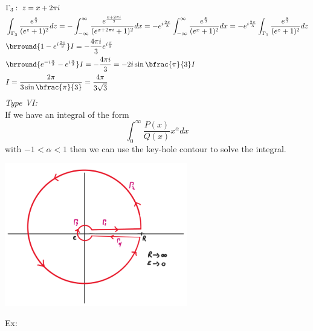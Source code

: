 \begin{align*}
    &\Gamma_3:\ z=x+2\pi i\\
    &\int_{\Gamma_3}\frac{e^{\frac{z}{3}}}{(e^z+1)^2}dz=-\int_{-\infty}^\infty \frac{e^{\frac{x+2\pi i}{3}}}{(e^{x+2\pi i}+1)^2}dx=-e^{i\frac{2\pi}{3}}\int_{-\infty}^\infty\frac{e^{\frac{x}{3}}}{(e^x+1)^2}dx=-e^{i\frac{2\pi}{3}}\int_{\Gamma_1}\frac{e^{\frac{z}{3}}}{(e^z+1)^2}dz\\
    &\brround{1-e^{i\frac{2\pi}{3}}}I=-\frac{4\pi i}{3}e^{i\frac{\pi}{3}}\\
    &\brround{e^{-i\frac{\pi}{3}}-e^{i\frac{\pi}{3}}}I=-\frac{4\pi i}{3}=-2i\sin\bfrac{\pi}{3}I\\
    &I=\frac{2\pi}{3\sin\bfrac{\pi}{3}}=\frac{4\pi}{3\sqrt{3}}
\end{align*}
\textit{Type VI:}\\
If we have an integral of the form
\[\int_0^\infty \frac{P(x)}{Q(x)}x^\alpha dx\]
with $-1<\alpha<1$ then we can use the key-hole contour to solve the integral.\\
\centerline{\includegraphics[width=0.6\textwidth]{Images/ComplexAnalysisPictures/KeyHole.png}}
Ex:
